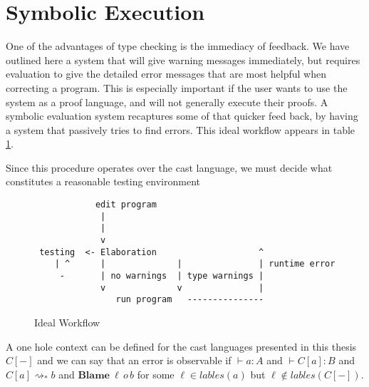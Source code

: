 
\section{Symbolic Execution}

One of the advantages of type checking is the immediacy of feedback.
We have outlined here a system that will give warning messages immediately,
but requires evaluation to give the detailed error messages that are
most helpful when correcting a program. This is especially important
if the user wants to use the system as a proof language, and will
not generally execute their proofs. A symbolic evaluation system recaptures
some of that quicker feed back, by having a system that passively
tries to find errors. This ideal workflow appears in table \ref{fig:notes-workflow}.

Since this procedure operates over the cast language, we must decide
what constitutes a reasonable testing environment

\begin{figure}
\begin{lstlisting}
            edit program
             |      
             |      
             v
 testing  <- Elaboration                    ^
    | ^      |              |               | runtime error
     -       | no warnings  | type warnings |
             v              v               |
                run program   ---------------
\end{lstlisting}


\caption{Ideal Workflow}
\label{fig:notes-workflow}
\end{figure}

A one hole context can be defined
for the cast languages presented in this thesis $C[-]$ and we can
say that an error is observable if $\vdash a:A$ and $\vdash C[a]:B$
and $C[a]\rightsquigarrow_{*}b$ and $\textbf{Blame}\:\ensuremath{\ell}\,o\,b$
for some $\ensuremath{\ell}\in lables\left(a\right)$ but $\ensuremath{\ell}\notin lables\left(C[-]\right)$.

